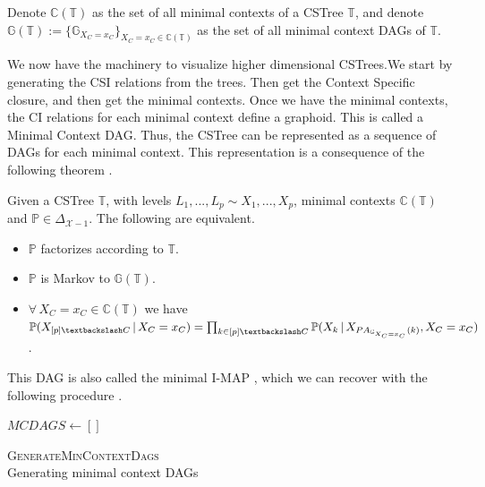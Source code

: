 \documentclass{tufte-book}
\begin{document}
Denote \(\mathbb{C}(\mathbb{T})\) as the set of all minimal contexts of a CSTree \(\mathbb{T}\), and denote \(\mathbb{G}(\mathbb{T}) := \{ \mathbb{G}_{X_C=x_C} \}_{X_C=x_C \in \mathbb{C}(\mathbb{T})}\) as the set of all minimal context DAGs of \(\mathbb{T}\).

We now have the machinery to visualize higher dimensional CSTrees.We start by generating the CSI relations from the trees. Then get the Context Specific closure, and then get the minimal contexts. Once we have the minimal contexts, the CI relations for each minimal context define a graphoid. This is called a Minimal Context DAG. Thus, the CSTree can be represented as a sequence of DAGs for each minimal context. This representation is a consequence of the following theorem \cite{duarte-2021-repres-learn}.

 \newpage 

\begin{theorem}\label{thm:markovtheoremcstrees}
Given a CSTree $\mathbb{T}$, with levels $L_1,...,L_p \sim X_1,...,X_p$, minimal contexts $\mathbb{C}(\mathbb{T})$ and $\mathbb{P} \in \Delta_{\mathcal{X}-1}$. The following are equivalent.
\begin{itemize}
\item $\mathbb{P}$ factorizes according to $\mathbb{T}$.
\item $\mathbb{P}$ is Markov to $\mathbb{G}(\mathbb{T})$.
\item $\forall \, X_C = x_C \in \mathbb{C}(\mathbb{T})$ we have\\ $\mathbb{P}(X_{[p]\textbackslash C}\,|\,X_C=x_C) = \prod_{k \in [p]\textbackslash C} \mathbb{P}(X_k \, |\, X_{PA_{\mathbb{G}_{X_C=x_C}}(k)}, X_C=x_C)$.
\end{itemize}
\end{theorem}


This DAG is also called the minimal I-MAP \cite{verma-1990-causal-networ}, which we can recover with the following procedure \cite{solus-2021-consis-guaran}.


\begin{algorithm}\label{alg:mcdags}
\SetAlgoLined
{}
$MCDAGS \gets []$\;

\caption{\textsc{GenerateMinContextDags} \\ Generating minimal context DAGs}
\end{algorithm}
\end{document}
